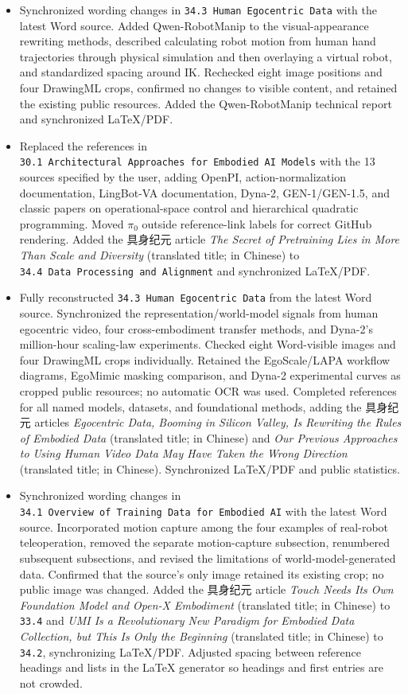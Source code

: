 \begin{itemize}
\item
  Synchronized wording changes in \texttt{34.3\ Human\ Egocentric\ Data} with the latest Word source. Added Qwen-RobotManip to the visual-appearance rewriting methods, described calculating robot motion from human hand trajectories through physical simulation and then overlaying a virtual robot, and standardized spacing around IK. Rechecked eight image positions and four DrawingML crops, confirmed no changes to visible content, and retained the existing public resources. Added the Qwen-RobotManip technical report and synchronized LaTeX/PDF.
\item
  Replaced the references in \texttt{30.1\ Architectural\ Approaches\ for\ Embodied\ AI\ Models} with the 13 sources specified by the user, adding OpenPI, action-normalization documentation, LingBot-VA documentation, Dyna-2, GEN-1/GEN-1.5, and classic papers on operational-space control and hierarchical quadratic programming. Moved \(\pi_0\) outside reference-link labels for correct GitHub rendering. Added the 具身纪元 article \emph{The Secret of Pretraining Lies in More Than Scale and Diversity} (translated title; in Chinese) to \texttt{34.4\ Data\ Processing\ and\ Alignment} and synchronized LaTeX/PDF.
\item
  Fully reconstructed \texttt{34.3\ Human\ Egocentric\ Data} from the latest Word source. Synchronized the representation/world-model signals from human egocentric video, four cross-embodiment transfer methods, and Dyna-2's million-hour scaling-law experiments. Checked eight Word-visible images and four DrawingML crops individually. Retained the EgoScale/LAPA workflow diagrams, EgoMimic masking comparison, and Dyna-2 experimental curves as cropped public resources; no automatic OCR was used. Completed references for all named models, datasets, and foundational methods, adding the 具身纪元 articles \emph{Egocentric Data, Booming in Silicon Valley, Is Rewriting the Rules of Embodied Data} (translated title; in Chinese) and \emph{Our Previous Approaches to Using Human Video Data May Have Taken the Wrong Direction} (translated title; in Chinese). Synchronized LaTeX/PDF and public statistics.
\item
  Synchronized wording changes in \texttt{34.1\ Overview\ of\ Training\ Data\ for\ Embodied\ AI} with the latest Word source. Incorporated motion capture among the four examples of real-robot teleoperation, removed the separate motion-capture subsection, renumbered subsequent subsections, and revised the limitations of world-model-generated data. Confirmed that the source's only image retained its existing crop; no public image was changed. Added the 具身纪元 article \emph{Touch Needs Its Own Foundation Model and Open-X Embodiment} (translated title; in Chinese) to \texttt{33.4} and \emph{UMI Is a Revolutionary New Paradigm for Embodied Data Collection, but This Is Only the Beginning} (translated title; in Chinese) to \texttt{34.2}, synchronizing LaTeX/PDF. Adjusted spacing between reference headings and lists in the LaTeX generator so headings and first entries are not crowded.

\end{itemize}
